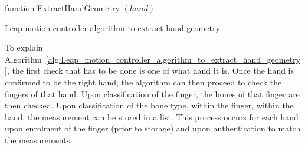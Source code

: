 \begin{algorithm}[H]

    \underline{function ExtractHandGeometry} $(hand)$\;
    \caption{Leap motion controller algorithm to extract hand geometry}     
    \label{alg:Leap_motion_controller_algorithm_to_extract_hand_geometry}
\end{algorithm}



To explain Algorithm~\ref{alg:Leap_motion_controller_algorithm_to_extract_hand_geometry}, the first check that has to be done is one of what hand it is. Once the hand is confirmed to be the right hand, the algorithm can then proceed to check the fingers of that hand. Upon classification of the finger, the bones of that finger are then checked. Upon classification of the bone type, within the finger, within the hand, the measurement can be stored in a list. This process occurs for each hand upon enrolment of the finger (prior to storage) and upon authentication to match the measurements.


